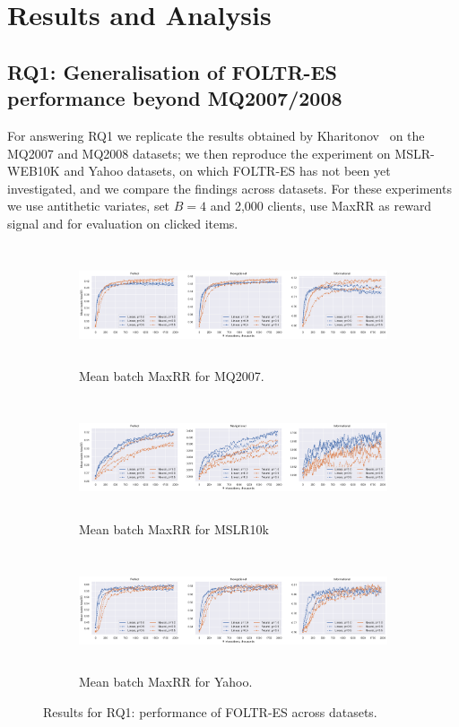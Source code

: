 \section{Results and Analysis}


\subsection{RQ1: Generalisation of FOLTR-ES performance beyond MQ2007/2008}
For answering RQ1 we replicate the results obtained by Kharitonov~\cite{kharitonov2019federated} on the MQ2007 and MQ2008 datasets; we then reproduce the experiment on MSLR-WEB10K and Yahoo datasets, on which FOLTR-ES has not been yet investigated, and we compare the findings across datasets. For these experiments we use antithetic variates, set $B = 4$ and 2,000 clients, use MaxRR as reward signal and for evaluation on clicked items. 

\begin{figure}[t]
	\centering
	\begin{subfigure}{1\textwidth}
		\includegraphics[width=15cm, height=3.5cm]{images/RQ1/mq2007_foltr_c2000_ps.png}
		\caption{Mean batch MaxRR for MQ2007.}
		\label{fig:mq2007-rq1}
	\end{subfigure}
	\begin{subfigure}{1\textwidth}
		\includegraphics[width=15cm, height=3.5cm]{images/RQ1/mslr10k_foltr_c2000_ps.png}
		\caption{Mean batch MaxRR for MSLR10k}
		\label{fig:mslr10k-rq1}
	\end{subfigure}
	\begin{subfigure}{1\textwidth}
		\includegraphics[width=15cm, height=3.5cm]{images/RQ1/yahoo_foltr_c2000_ps.png}
		\caption{Mean batch MaxRR for Yahoo.}
		\label{fig:yahoo-rq1}
	\end{subfigure}
	\caption{Results for RQ1: performance of FOLTR-ES across datasets. \label{fig:RQ1}}
\end{figure}

